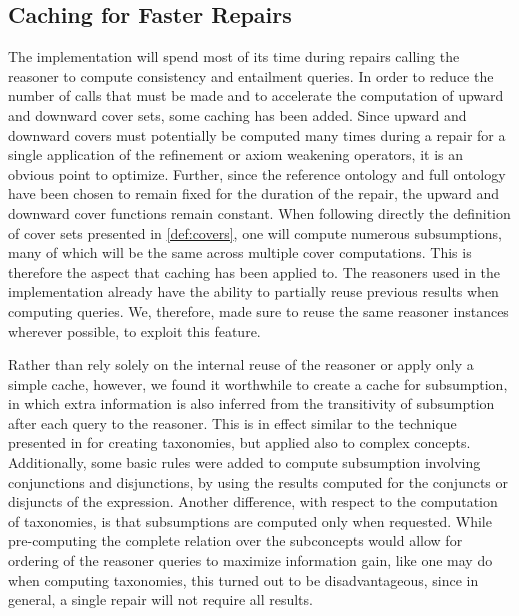 \subsection{Caching for Faster Repairs}\label{cache-impl}

The implementation will spend most of its time during repairs calling the reasoner to compute consistency and entailment queries. In order to reduce the number of calls that must be made and to accelerate the computation of upward and downward cover sets, some caching has been added. Since upward and downward covers must potentially be computed many times during a repair for a single application of the refinement or axiom weakening operators, it is an obvious point to optimize. Further, since the reference ontology and full ontology have been chosen to remain fixed for the duration of the repair, the upward and downward cover functions remain constant. When following directly the definition of cover sets presented in \cref{def:covers}, one will compute numerous subsumptions, many of which will be the same across multiple cover computations. This is therefore the aspect that caching has been applied to. The reasoners used in the implementation already have the ability to partially reuse previous results when computing queries. We, therefore, made sure to reuse the same reasoner instances wherever possible, to exploit this feature.

Rather than rely solely on the internal reuse of the reasoner or apply only a simple cache, however, we found it worthwhile to create a cache for subsumption, in which extra information is also inferred from the transitivity of subsumption after each query to the reasoner. This is in effect similar to the technique presented in \cite{shearer2009exploiting} for creating taxonomies, but applied also to complex concepts. Additionally, some basic rules were added to compute subsumption involving conjunctions and disjunctions, by using the results computed for the conjuncts or disjuncts of the expression. Another difference, with respect to the computation of taxonomies, is that subsumptions are computed only when requested. While pre-computing the complete relation over the subconcepts would allow for ordering of the reasoner queries to maximize information gain, like one may do when computing taxonomies, this turned out to be disadvantageous, since in general, a single repair will not require all results. 


